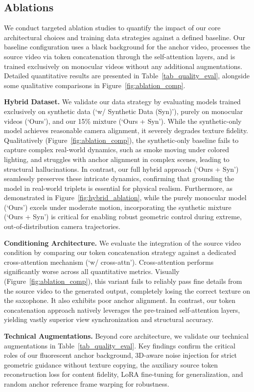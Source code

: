 \subsection{Ablations}
\label{sec:ablations}

We conduct targeted ablation studies to quantify the impact of our core architectural choices and training data strategies against a defined baseline. Our baseline configuration uses a black background for the anchor video, processes the source video via token concatenation through the self-attention layers, and is trained exclusively on monocular videos without any additional augmentations. Detailed quantitative results are presented in Table~\ref{tab_quality_eval}, alongside some qualitative comparisons in Figure~\ref{fig:ablation_comp}.

\noindent\textbf{Hybrid Dataset.} We validate our data strategy by evaluating models trained exclusively on synthetic data (`w/ Synthetic Data (Syn)'), purely on monocular videos (`Ours'), and our 15\% mixture (`Ours + Syn'). While the synthetic-only model achieves reasonable camera alignment, it severely degrades texture fidelity. Qualitatively (Figure~\ref{fig:ablation_comp}), the synthetic-only baseline fails to capture complex real-world dynamics, such as smoke moving under colored lighting, and struggles with anchor alignment in complex scenes, leading to structural hallucinations. In contrast, our full hybrid approach (`Ours + Syn') seamlessly preserves these intricate dynamics, confirming that grounding the model in real-world triplets is essential for physical realism. Furthermore, as demonstrated in Figure~\ref{fig:hybrid_ablation}, while the purely monocular model (`Ours') excels under moderate motion, incorporating the synthetic mixture (`Ours + Syn') is critical for enabling robust geometric control during extreme, out-of-distribution camera trajectories.

\noindent\textbf{Conditioning Architecture.} We evaluate the integration of the source video condition by comparing our token concatenation strategy against a dedicated cross-attention mechanism (`w/ cross-attn'). Cross-attention performs significantly worse across all quantitative metrics. Visually (Figure~\ref{fig:ablation_comp}), this variant fails to reliably pass fine details from the source video to the generated output, completely losing the correct texture on the saxophone. It also exhibits poor anchor alignment. In contrast, our token concatenation approach natively leverages the pre-trained self-attention layers, yielding vastly superior view synchronization and structural accuracy.

\noindent\textbf{Technical Augmentations.} Beyond core architecture, we validate our technical augmentations in Table~\ref{tab_quality_eval}. Key findings confirm the critical roles of our fluorescent anchor background, 3D-aware noise injection for strict geometric guidance without texture copying, the auxiliary source token reconstruction loss for content fidelity, LoRA fine-tuning for generalization, and random anchor reference frame warping for robustness.
